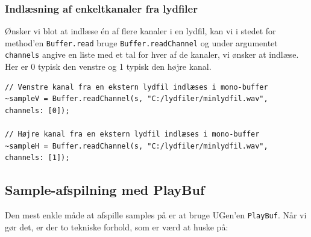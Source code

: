 \subsubsection{Indlæsning af enkeltkanaler fra lydfiler}

Ønsker vi blot at indlæse én af flere kanaler i en lydfil, kan vi i stedet for method'en \texttt{Buffer.read} bruge \texttt{Buffer.readChannel} og under argumentet \texttt{channels} angive en liste med et tal for hver af de kanaler, vi ønsker at indlæse. Her er 0 typisk den venstre og 1 typisk den højre kanal.

\begin{listing}[H]
\begin{verbatim}
// Venstre kanal fra en ekstern lydfil indlæses i mono-buffer
~sampleV = Buffer.readChannel(s, "C:/lydfiler/minlydfil.wav", channels: [0]);

// Højre kanal fra en ekstern lydfil indlæses i mono-buffer
~sampleH = Buffer.readChannel(s, "C:/lydfiler/minlydfil.wav", channels: [1]);
\end{verbatim}
\caption{Indlæsning af lydfil i mono-buffer}
\end{listing}
\subsection{Sample-afspilning med PlayBuf}

Den mest enkle måde at afspille samples på er at bruge UGen'en \texttt{PlayBuf}. Når vi gør det, er der to tekniske forhold, som er værd at huske på:

